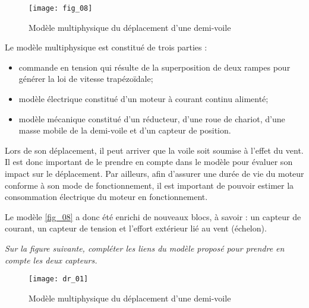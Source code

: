\begin{multicols}{2}
\begin{figure}[H]
\centering
\texttt{[image: fig\_08]}
\caption{Modèle multiphysique du déplacement d’une demi-voile \label{fig_08}}
\end{figure}

Le modèle multiphysique est constitué de trois parties :
\begin{itemize}
\item commande en tension qui résulte de la superposition de deux rampes pour générer la loi de vitesse trapézoïdale;
\item modèle électrique constitué d’un moteur à courant continu alimenté;%
\item modèle mécanique constitué d’un réducteur, d’une roue de chariot, d’une masse mobile de la demi-voile et
d’un capteur de position.
\end{itemize}


%

Lors de son déplacement, il peut arriver que la voile soit soumise à l’effet du vent. Il est donc important de
le prendre en compte dans le modèle pour évaluer son impact sur le déplacement. Par ailleurs, afin d’assurer
une durée de vie du moteur conforme à son mode de fonctionnement, il est important de pouvoir estimer la
consommation électrique du moteur en fonctionnement.

Le modèle \autoref{fig_08} a donc été enrichi de nouveaux blocs, à savoir : un capteur de courant, un capteur de tension
et l’effort extérieur lié au vent (échelon).
\fi


\question{\label{q5}}\textit{Sur la figure suivante, compléter les liens du modèle proposé pour prendre en compte
les deux capteurs.}
\ifprof
\begin{corrige}

\end{corrige}
\else
\fi




\ifprof
\else
\end{multicols}
\fi

\ifprof
\else
\begin{figure}[H]
\centering
\texttt{[image: dr\_01]}
\caption{Modèle multiphysique du déplacement d’une demi-voile \label{dr_01}}
\end{figure}

\fi
